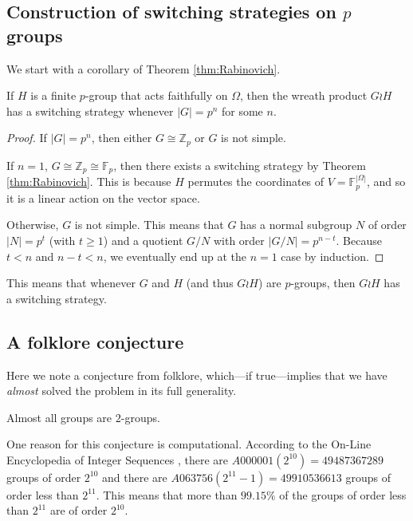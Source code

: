 \subsection{Construction of switching strategies on \texorpdfstring{$p$}{p} groups}
We start with a corollary of Theorem \ref{thm:Rabinovich}.
\begin{corollary}
  If $H$ is a finite $p$-group that acts faithfully on $\Omega$,
  then the wreath product
  $G \wr H$ has a switching strategy whenever $|G| = p^n$ for some $n$.
\end{corollary}
\begin{proof}
  If $|G| = p^n$, then either $G \cong \mathbb{Z}_p$ or $G$ is not simple.

  If $n = 1$, $G \cong \mathbb{Z}_p \cong \mathbb F_p$, then there exists a
  switching strategy by Theorem \ref{thm:Rabinovich}. This is because $H$
  permutes the coordinates of $V = \mathbb F_p^{|\Omega|}$, and so it is a
  linear action on the vector space.

  Otherwise, $G$ is not simple. This means that $G$ has a normal subgroup $N$
  of order $|N| = p^t$ (with $t \geq 1$) and a quotient $G/N$ with order $|G/N| = p^{n-t}$.
  Because $t < n$ and $n - t < n$, we eventually end up at the $n=1$ case by
  induction.
\end{proof}

This means that whenever $G$ and $H$ (and thus $G \wr H$) are $p$-groups,
then $G \wr H$ has a switching strategy.

\subsection{A folklore conjecture}
Here we note a conjecture from folklore, which---if true---implies that we have
\textit{almost} solved the problem in its full generality.
\begin{conjecture}[Folklore]
  Almost all groups are $2$-groups.
\end{conjecture}

One reason for this conjecture is computational. According to the
On-Line Encyclopedia of Integer Sequences \cite{oeis},
there are $A000001(2^{10}) = 49487367289$ groups of order $2^{10}$ and there are
$A063756(2^{11}-1) = 49910536613$ groups of order less than $2^{11}$.
This means that more than $99.15\%$ of the groups of order less than $2^{11}$
are of order $2^{10}$.

